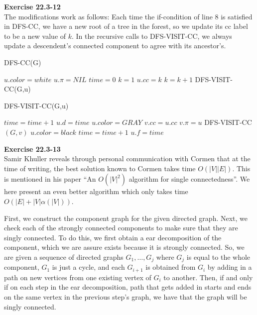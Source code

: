 \documentclass{article}
\begin{document}
\noindent\textbf{Exercise 22.3-12}\\

The modifications work as follows:  Each time the if-condition of line 8 is satisfied in DFS-CC, we have a new root of a tree in the forest, so we update its cc label to be a new value of $k$.  In the recursive calls to DFS-VISIT-CC, we always update a descendent's connected component to agree with its ancestor's. \\

\begin{algorithm}
\caption{DFS-CC(G)}
\begin{algorithmic}[1]
	\State $u.color = white$
	\State $u.\pi = NIL$
\EndFor
\State $time = 0$
\State $k = 1$
		\State $u.cc = k$
		\State $k = k + 1$
		\State DFS-VISIT-CC(G,u)
	\EndIf
\EndFor
\end{algorithmic}
\end{algorithm}


\begin{algorithm}
\caption{DFS-VISIT-CC(G,u)}
\begin{algorithmic}[1]
\State $time = time + 1$
\State $u.d = time$
\State $u.color = GRAY$
	\State $v.cc = u.cc$
		\State $v.\pi = u$
		\State DFS-VISIT-CC$(G,v)$
	\EndIf
\EndFor 
\State $u.color = black$
\State $time = time + 1$
\State $u.f = time$
\end{algorithmic}
\end{algorithm}

\noindent\textbf{Exercise 22.3-13}\\

Samir Khuller reveals through personal communication with Cormen that at the time of writing, the best solution known to Cormen takes time $O(|V||E|)$. This is mentioned in his paper ``An $O(|V|^2)$ algorithm for single connectedness''. We here present an even better algorithm which only takes time $O(|E| + |V|\alpha(|V|))$.

First, we construct the component graph for the given directed graph. Next, we check each of the strongly connected components to make sure that they are singly connected. To do this, we first obtain a ear decomposition of the component, which we are assure exists because it is strongly connected. So, we are given a sequence of directed graphs $G_1, \ldots,G_j$ where $G_j$ is equal to the whole component, $G_1$ is just a cycle, and each $G_{i+1}$ is obtained from $G_i$ by adding in a path on new vertices from one existing vertex of $G_i$ to another. Then, if and only if on each step in the ear decomposition, path that gets added in starts and ends on the same vertex in the previous step's graph, we have that the graph will be singly connected.
\end{document}
